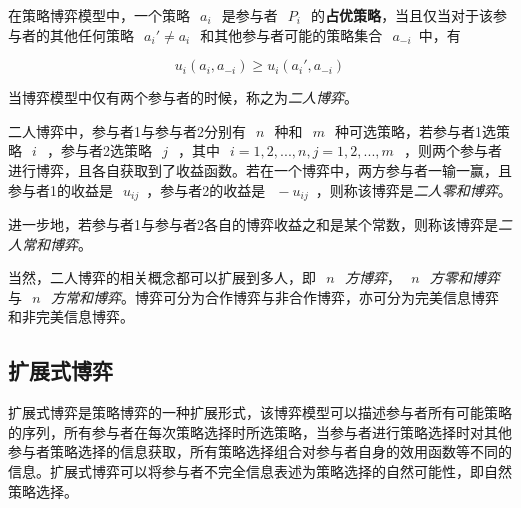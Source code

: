 \begin{definition}
	在策略博弈模型中，一个策略~$~a_i~$~是参与者~$~P_i~$~的\textbf{占优策略}，当且仅当对于该参与者的其他任何策略~$~a_i'\neq a_i~$~和其他参与者可能的策略集合~$~a_{-i}$~中，有
	
	\begin{equation}
	u_i(a_i,a_{-i}) \geq 	u_i(a_i',a_{-i})
	\end{equation}
\end{definition}

\begin{definition}
	当博弈模型中仅有两个参与者的时候，称之为\textit{二人博弈}。
\end{definition}



\begin{definition}
二人博弈中，参与者1与参与者2分别有~$~n~$~种和~$~m~$~种可选策略，若参与者1选策略~$~i~$~，参与者2选策略~$~j~$~，其中~$~i=1,2,...,n,j=1,2,...,m~$~，则两个参与者进行博弈，且各自获取到了收益函数。若在一个博弈中，两方参与者一输一赢，且参与者1的收益是~$~u_{ij}$~，参与者2的收益是~$~-u_{ij}$~，则称该博弈是\textit{二人零和博弈}。
\end{definition}

\begin{definition}
	进一步地，若参与者1与参与者2各自的博弈收益之和是某个常数，则称该博弈是\textit{二人常和博弈}。
\end{definition}

当然，二人博弈的相关概念都可以扩展到多人，即\textit{~$~n~$~方博弈}，\textit{~$~n~$~方零和博弈}与\textit{~$~n~$~方常和博弈}。博弈可分为合作博弈与非合作博弈，亦可分为完美信息博弈和非完美信息博弈。



\subsection{扩展式博弈}

扩展式博弈是策略博弈的一种扩展形式，该博弈模型可以描述参与者所有可能策略的序列，所有参与者在每次策略选择时所选策略，当参与者进行策略选择时对其他参与者策略选择的信息获取，所有策略选择组合对参与者自身的效用函数等不同的信息。扩展式博弈可以将参与者不完全信息表述为策略选择的自然可能性，即自然策略选择。

